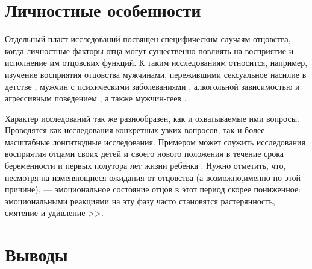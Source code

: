 \documentclass{../../common/thesisbyxetex}
\begin{document}
\section{Личностные особенности} 

Отдельный пласт исследований посвящен специфическим случаям отцовства, когда личностные факторы 
отца могут существенно повлиять на восприятие и исполнение им отцовских функций. К таким 
исследованиям относится, например, изучение восприятия отцовства мужчинами, пережившими сексуальное 
насилие в детстве \cite{sex}, мужчин с психическими заболеваниями \cite{gbi}, алкогольной 
зависимостью и агрессивным поведением \cite{alc}, а также мужчин-геев \cite{gay}.


Характер исследований так же разнообразен, как и охватываемые ими вопросы. Проводятся как 
исследования конкретных узких вопросов, так и более масштабные лонгитюдные исследования. Примером 
может служить исследования восприятия отцами своих детей и своего нового положения в течение срока 
беременности и первых полутора лет жизни ребенка \cite{percep}. Нужно отметить, что, несмотря на 
изменяющиеся ожидания от отцовства (а возможно,именно по этой причине), --- эмоциональное состояние 
отцов в этот период скорее пониженное: эмоциональными реакциями на эту фазу часто 
становятся растерянность, смятение и удивление \cite[12]{meta}>>.


\section*{Выводы}
\end{document}
